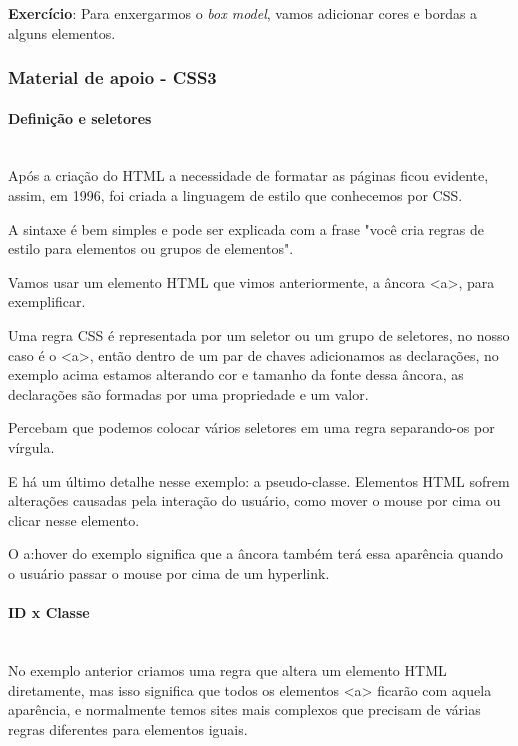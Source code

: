 \documentclass[12pt,a4paper]{article}
\begin{document}
	\textbf{Exercício}: Para enxergarmos o \textit{box model}, vamos adicionar cores e bordas a alguns elementos.
	
	\subsubsection{Material de apoio - CSS3} \label{sec:material-de-apoio-css}
	
	\paragraph{Definição e seletores} \mbox{} \\
	
	Após a criação do HTML a necessidade de formatar as páginas ficou evidente, assim, em 1996, foi criada a linguagem de estilo que conhecemos por CSS.
	
	A sintaxe é bem simples e pode ser explicada com a frase "você cria regras de estilo para elementos ou grupos de elementos".
	
	Vamos usar um elemento HTML que vimos anteriormente, a âncora <a>, para exemplificar.
	
	Uma regra CSS é representada por um seletor ou um grupo de seletores, no nosso caso é o <a>, então dentro de um par de chaves adicionamos as declarações, no exemplo acima estamos alterando cor e tamanho da fonte dessa âncora, as declarações são formadas por uma propriedade e um valor.
	
	Percebam que podemos colocar vários seletores em uma regra separando-os por vírgula.
	
	E há um último detalhe nesse exemplo: a pseudo-classe. Elementos HTML sofrem alterações causadas pela interação do usuário, como mover o mouse por cima ou clicar nesse elemento.
	
	O a:hover do exemplo significa que a âncora também terá essa aparência quando o usuário passar o mouse por cima de um hyperlink.
	
	\paragraph{ID x Classe} \mbox{} \\
	
	No exemplo anterior criamos uma regra que altera um elemento HTML diretamente, mas isso significa que todos os elementos <a> ficarão com aquela aparência, e normalmente temos sites mais complexos que precisam de várias regras diferentes para elementos iguais.
	
\end{document}
